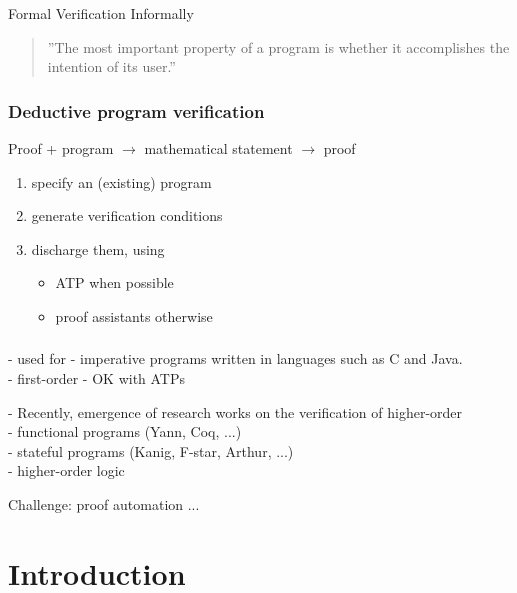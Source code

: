 \begin{frame}{Formal Verification Informally}
\begin{quotation}
 ''The most important property of a program is whether it accomplishes the intention of its user.''\\
\hfill{}
\end{quotation}
\bigskip
\end{frame}

\begin{frame}
\frametitle{Deductive program verification}
Proof + program $\rightarrow$ mathematical statement  $\rightarrow$ proof \\[1cm]
\pause
  \begin{enumerate}
  \item {\red specify} an (existing) program \pause

  \item {\red generate} verification conditions \pause
  \item {\red discharge} them, using
    \begin{itemize}
    \item ATP when possible
    \item proof assistants otherwise
    \end{itemize}
  \end{enumerate}
\end{frame}

\begin{frame}
\frametitle{}
- used for  
	-  imperative programs written in languages such as C and Java.  \\
	-  first-order 
	-  OK with ATPs

- Recently, emergence of research works on the verification of higher-order \\
	- functional programs (Yann, Coq, ...)\\
	- stateful programs (Kanig, F-star, Arthur, ...)\\
  - higher-order logic

Challenge: proof automation ...
\end{frame}

\section*{Introduction}
